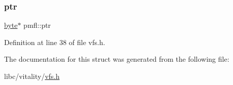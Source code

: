 \subsubsection{\texorpdfstring{ptr}{ptr}}
{\footnotesize\ttfamily \hyperlink{a00140_ab8ef12fab634c171394422d0ee8baf94_ab8ef12fab634c171394422d0ee8baf94}{byte}$\ast$ pmfl\+::ptr}



Definition at line 38 of file vfs.\+h.



The documentation for this struct was generated from the following file\+:\begin{DoxyCompactItemize}
\item 
libc/vitality/\hyperlink{a00191}{vfs.\+h}\end{DoxyCompactItemize}
